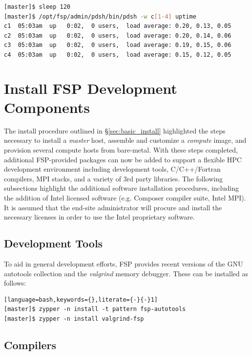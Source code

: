 \documentclass[letterpaper]{article}
\begin{document}
\begin{lstlisting}[language=bash]
[master]$ sleep 120
[master]$ /opt/fsp/admin/pdsh/bin/pdsh -w c[1-4] uptime
c1  05:03am  up   0:02,  0 users,  load average: 0.20, 0.13, 0.05
c2  05:03am  up   0:02,  0 users,  load average: 0.20, 0.14, 0.06
c3  05:03am  up   0:02,  0 users,  load average: 0.19, 0.15, 0.06
c4  05:03am  up   0:02,  0 users,  load average: 0.15, 0.12, 0.05
\end{lstlisting}



\section{Install FSP Development Components}

The install procedure outlined in \S\ref{sec:basic_install}
highlighted the steps necessary to install a {\em master} host,
assemble and customize a {\em compute} image, and provision several
compute hosts from bare-metal.  With these steps completed, 
additional FSP-provided packages can now be added to support a flexible HPC
development environment including development tools, C/C++/Fortran compilers,
MPI stacks, and a variety of 3rd party libraries. The following subsections
highlight the additional software installation procedures, including the
addition of Intel licensed software (e.g. Composer compiler suite, Intel
MPI). It is assumed that the end-site administrator will procure and install
the necessary licenses in order to use the Intel proprietary software.

\subsection{Development Tools}

To aid in general development efforts, FSP provides recent versions of the GNU
autotools collection and the {\em valgrind} memory debugger. These can be installed as follows:

\begin{lstlisting}[language=bash,keywords={},literate={-}{-}1]
[master]$ zypper -n install -t pattern fsp-autotools
[master]$ zypper -n install valgrind-fsp
\end{lstlisting}

\subsection{Compilers}
\end{document}
